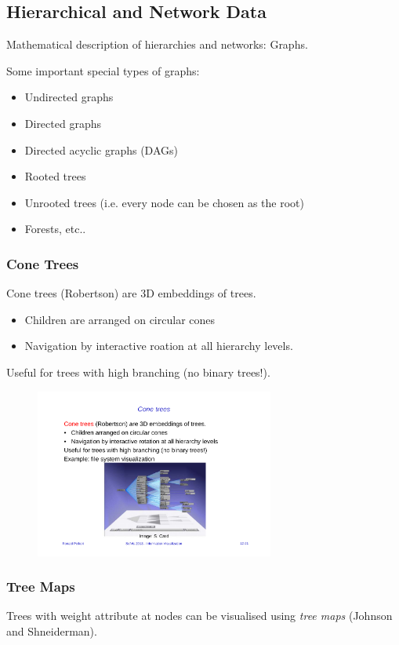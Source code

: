 \subsection{Hierarchical and Network Data}
Mathematical description of hierarchies and networks: Graphs.

Some important special types of graphs:
\begin{itemize}
\item Undirected graphs
\item Directed graphs
\item Directed acyclic graphs (DAGs)
\item Rooted trees
\item Unrooted trees (i.e. every node can be chosen as the root)
\item Forests, etc..
\end{itemize}

\subsubsection{Cone Trees}
Cone trees (Robertson) are 3D embeddings of trees.
\begin{itemize}
\item Children are arranged on circular cones
\item Navigation by interactive roation at all hierarchy levels.
\end{itemize}

Useful for trees with high branching (no binary trees!).
\begin{figure}[H]
\centering
\includegraphics[width=0.7\textwidth]{img/12_cone_tree}
\end{figure}

\subsubsection{Tree Maps}
Trees with weight attribute at nodes can be visualised using \emph{tree maps} (Johnson and Shneiderman).

